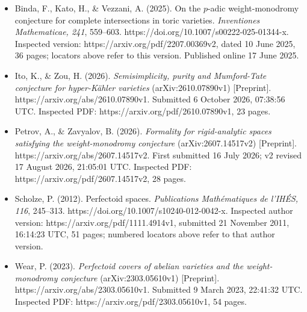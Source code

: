 \begin{itemize}
\tightlist
\item
  Binda, F., Kato, H., \& Vezzani, A. (2025). On the \(p\)-adic
  weight-monodromy conjecture for complete intersections in toric
  varieties. \emph{Inventiones Mathematicae, 241}, 559--603.
  https://doi.org/10.1007/s00222-025-01344-x. Inspected version:
  https://arxiv.org/pdf/2207.00369v2, dated 10 June 2025, 36 pages;
  locators above refer to this version. Published online 17 June 2025.
\item
  Ito, K., \& Zou, H. (2026). \emph{Semisimplicity, purity and
  Mumford-Tate conjecture for hyper-Kähler varieties}
  (arXiv:2610.07890v1) {[}Preprint{]}.
  https://arxiv.org/abs/2610.07890v1. Submitted 6 October 2026, 07:38:56
  UTC. Inspected PDF: https://arxiv.org/pdf/2610.07890v1, 23 pages.
\item
  Petrov, A., \& Zavyalov, B. (2026). \emph{Formality for rigid-analytic
  spaces satisfying the weight-monodromy conjecture}
  (arXiv:2607.14517v2) {[}Preprint{]}.
  https://arxiv.org/abs/2607.14517v2. First submitted 16 July 2026; v2
  revised 17 August 2026, 21:05:01 UTC. Inspected PDF:
  https://arxiv.org/pdf/2607.14517v2, 28 pages.
\item
  Scholze, P. (2012). Perfectoid spaces. \emph{Publications
  Mathématiques de l'IHÉS, 116}, 245--313.
  https://doi.org/10.1007/s10240-012-0042-x. Inspected author version:
  https://arxiv.org/pdf/1111.4914v1, submitted 21 November 2011,
  16:14:23 UTC, 51 pages; numbered locators above refer to that author
  version.
\item
  Wear, P. (2023). \emph{Perfectoid covers of abelian varieties and the
  weight-monodromy conjecture} (arXiv:2303.05610v1) {[}Preprint{]}.
  https://arxiv.org/abs/2303.05610v1. Submitted 9 March 2023, 22:41:32
  UTC. Inspected PDF: https://arxiv.org/pdf/2303.05610v1, 54 pages.
\end{itemize}
